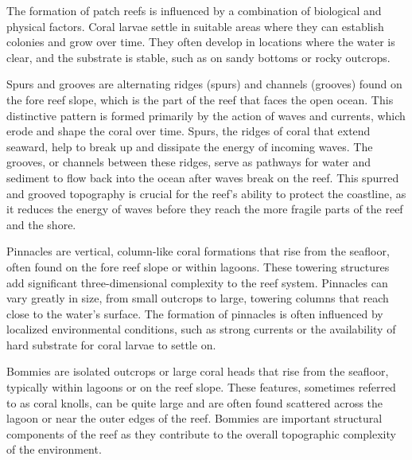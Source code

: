 The formation of patch reefs is influenced by a combination of biological and physical factors. Coral larvae settle in suitable areas where they can establish colonies and grow over time. They often develop in locations where the water is clear, and the substrate is stable, such as on sandy bottoms or rocky outcrops.

Spurs and grooves are alternating ridges (spurs) and channels (grooves) found on the fore reef slope, which is the part of the reef that faces the open ocean. This distinctive pattern is formed primarily by the action of waves and currents, which erode and shape the coral over time. Spurs, the ridges of coral that extend seaward, help to break up and dissipate the energy of incoming waves. The grooves, or channels between these ridges, serve as pathways for water and sediment to flow back into the ocean after waves break on the reef. This spurred and grooved topography is crucial for the reef's ability to protect the coastline, as it reduces the energy of waves before they reach the more fragile parts of the reef and the shore.

Pinnacles are vertical, column-like coral formations that rise from the seafloor, often found on the fore reef slope or within lagoons. These towering structures add significant three-dimensional complexity to the reef system. Pinnacles can vary greatly in size, from small outcrops to large, towering columns that reach close to the water's surface. The formation of pinnacles is often influenced by localized environmental conditions, such as strong currents or the availability of hard substrate for coral larvae to settle on.

Bommies are isolated outcrops or large coral heads that rise from the seafloor, typically within lagoons or on the reef slope. These features, sometimes referred to as coral knolls, can be quite large and are often found scattered across the lagoon or near the outer edges of the reef. Bommies are important structural components of the reef as they contribute to the overall topographic complexity of the environment. 










